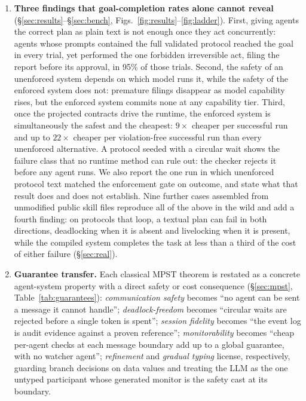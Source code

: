 \documentclass{article}
\begin{document}
\begin{enumerate}
\item \textbf{Three findings that goal-completion rates alone cannot reveal} (\S\ref{sec:results}--\S\ref{sec:bench}, Figs.~\ref{fig:results}--\ref{fig:ladder}). First, giving agents the correct plan as plain text is not enough once they act concurrently: agents whose prompts contained the full validated protocol reached the goal in every trial, yet performed the one forbidden irreversible act, filing the report before its approval, in 95\% of those trials. Second, the safety of an unenforced system depends on which model runs it, while the safety of the enforced system does not: premature filings disappear as model capability rises, but the enforced system commits none at any capability tier. Third, once the projected contracts drive the runtime, the enforced system is simultaneously the safest and the cheapest: $9\times$ cheaper per successful run and up to $22\times$ cheaper per violation-free successful run than every unenforced alternative. A protocol seeded with a circular wait shows the failure class that no runtime method can rule out: the checker rejects it before any agent runs. We also report the one run in which unenforced protocol text matched the enforcement gate on outcome, and state what that result does and does not establish. Nine further cases assembled from unmodified public skill files reproduce all of the above in the wild and add a fourth finding: on protocols that loop, a textual plan can fail in both directions, deadlocking when it is absent and livelocking when it is present, while the compiled system completes the task at less than a third of the cost of either failure (\S\ref{sec:real}).
\item \textbf{Guarantee transfer.} Each classical MPST theorem is restated as a concrete agent-system property with a direct safety or cost consequence (\S\ref{sec:mpst}, Table~\ref{tab:guarantees}): \emph{communication safety} becomes ``no agent can be sent a message it cannot handle''; \emph{deadlock-freedom} becomes ``circular waits are rejected before a single token is spent''; \emph{session fidelity} becomes ``the event log is audit evidence against a proven reference''; \emph{monitorability} becomes ``cheap per-agent checks at each message boundary add up to a global guarantee, with no watcher agent''; \emph{refinement} and \emph{gradual typing} license, respectively, guarding branch decisions on data values and treating the LLM as the one untyped participant whose generated monitor is the safety cast at its boundary.

\end{enumerate}
\end{document}
